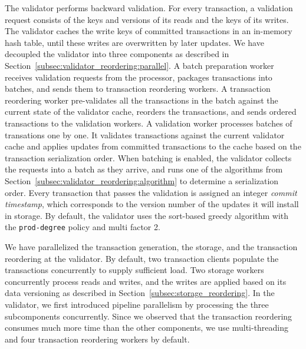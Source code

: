 The validator performs backward validation. For every transaction, a validation request consists of the keys and versions of its reads and the keys of its writes. The validator caches the write keys of committed transactions in an in-memory hash table, until these writes are overwritten by later updates.
We have decoupled the validator into three components as described in Section~\ref{subsec:validator_reordering:parallel}. A batch preparation worker receives validation requests from the processor, packages transactions into batches, and sends them to transaction reordering workers. A transaction reordering worker pre-validates all the transactions in the batch against the current state of the validator cache, reorders the transactions, and sends ordered transactions to the validation workers. A validation worker processes batches of transations one by one. It validates transactions against the current validator cache and applies updates from committed transactions to the cache based on the transaction serialization order.  When batching is enabled, the validator collects the requests into a batch as they arrive, and runs one of the algorithms from Section~\ref{subsec:validator_reordering:algorithm} to determine a serialization order. Every transaction that passes the validation is assigned an integer \emph{commit timestamp}, which corresponds to the version number of the updates it will install in storage. 
By default, the validator uses the sort-based greedy algorithm with the \texttt{prod-degree} policy and multi factor 2.


We have parallelized the transaction generation, the storage, and the transaction reordering at the validator. By default, two transaction clients populate the transactions concurrently to supply sufficient load. Two storage workers concurrently process reads and writes, 
and the writes are applied based on its data versioning as described in Section~\ref{subsec:storage_reordering}. 
In the validator, we first introduced pipeline parallelism by processing the three subcomponents concurrently. Since we observed that the transaction reordering consumes much more time than the other components, we use multi-threading and four transaction reordering workers by default.

